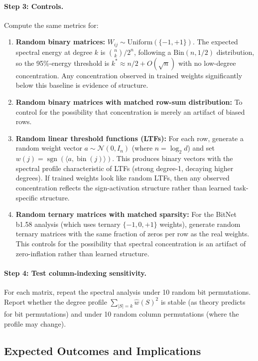 \documentclass[12pt,a4paper]{article}
\theoremstyle{plain}
\theoremstyle{definition}
\theoremstyle{remark}
\newcommand{\pmone}{\{-1,+1\}}
\newcommand{\what}{\widehat{w}}
\newcommand{\sgn}{\operatorname{sgn}}
\newcommand{\ip}[2]{\langle #1, #2 \rangle}
\DeclareMathOperator{\bin}{bin}
\begin{document}
\paragraph{Step 3: Controls.}
Compute the same metrics for:
\begin{enumerate}[label=(\alph*)]
    \item \textbf{Random binary matrices:} $W_{ij} \sim \text{Uniform}(\pmone)$. The expected spectral energy at degree $k$ is $\binom{n}{k}/2^n$, following a $\text{Bin}(n, 1/2)$ distribution, so the 95\%-energy threshold is $k^* \approx n/2 + O(\sqrt{n})$ with no low-degree concentration. Any concentration observed in trained weights significantly below this baseline is evidence of structure.
    \item \textbf{Random binary matrices with matched row-sum distribution:} To control for the possibility that concentration is merely an artifact of biased rows.
    \item \textbf{Random linear threshold functions (LTFs):} For each row, generate a random weight vector $a \sim \mathcal{N}(0, I_n)$ (where $n = \log_2 d$) and set $w(j) = \sgn(\ip{a}{\bin(j)})$. This produces binary vectors with the spectral profile characteristic of LTFs (strong degree-1, decaying higher degrees). If trained weights look like random LTFs, then any observed concentration reflects the sign-activation structure rather than learned task-specific structure.
    \item \textbf{Random ternary matrices with matched sparsity:} For the BitNet b1.58 analysis (which uses ternary $\{-1, 0, +1\}$ weights), generate random ternary matrices with the same fraction of zeros per row as the real weights. This controls for the possibility that spectral concentration is an artifact of zero-inflation rather than learned structure.
\end{enumerate}

\paragraph{Step 4: Test column-indexing sensitivity.}
For each matrix, repeat the spectral analysis under 10 random bit permutations. Report whether the degree profile $\sum_{|S|=k} \what(S)^2$ is stable (as theory predicts for bit permutations) and under 10 random column permutations (where the profile may change).

\subsection{Expected Outcomes and Implications}\label{sec:pilot-outcomes}
\end{document}
